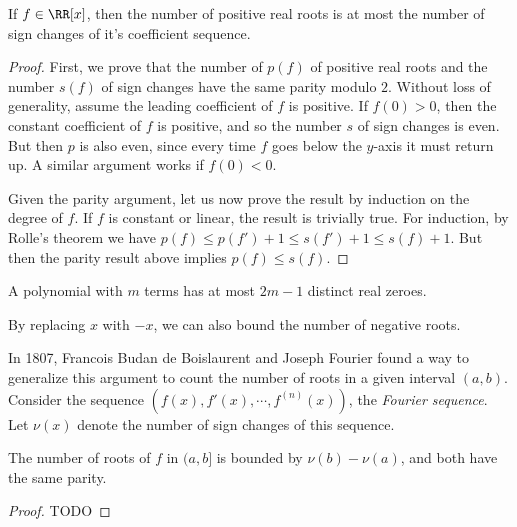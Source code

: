 \begin{theorem}
    If $f \in \RR[x]$, then the number of positive real roots is at most the number of sign changes of it's coefficient sequence.
\end{theorem}
\begin{proof}
    First, we prove that the number of $p(f)$ of positive real roots and the number $s(f)$ of sign changes have the same parity modulo $2$. Without loss of generality, assume the leading coefficient of $f$ is positive. If $f(0) > 0$, then the constant coefficient of $f$ is positive, and so the number $s$ of sign changes is even. But then $p$ is also even, since every time $f$ goes below the $y$-axis it must return up. A similar argument works if $f(0) < 0$.

    Given the parity argument, let us now prove the result by induction on the degree of $f$. If $f$ is constant or linear, the result is trivially true. For induction, by Rolle's theorem we have $p(f) \leq p(f') + 1 \leq s(f') + 1 \leq s(f) + 1$. But then the parity result above implies $p(f) \leq s(f)$.
\end{proof}

\begin{corollary}
    A polynomial with $m$ terms has at most $2m-1$ distinct real zeroes.
\end{corollary}

By replacing $x$ with $-x$, we can also bound the number of negative roots.

In 1807, Francois Budan de Boislaurent and Joseph Fourier found a way to generalize this argument to count the number of roots in a given interval $(a,b)$. Consider the sequence $(f(x), f'(x), \cdots, f^{(n)}(x))$, the \emph{Fourier sequence}. Let $\nu(x)$ denote the number of sign changes of this sequence. 

\begin{theorem}
    The number of roots of $f$ in $(a,b]$ is bounded by $\nu(b) - \nu(a)$, and both have the same parity.
\end{theorem}
\begin{proof}
    TODO
\end{proof}











